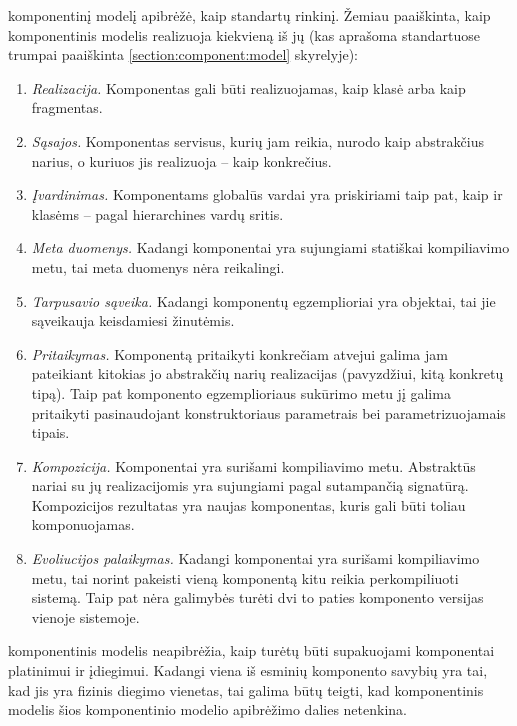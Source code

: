 \cite[37]{heineman2001component} komponentinį modelį apibrėžė, kaip
standartų rinkinį. Žemiau paaiškinta, kaip 
komponentinis modelis realizuoja kiekvieną iš jų (kas aprašoma
standartuose trumpai paaiškinta \ref{section:component:model}
skyrelyje):
\begin{enumerate}
  \item \emph{Realizacija.}
    Komponentas gali būti realizuojamas, kaip  klasė
    arba kaip fragmentas.
  \item \emph{Sąsajos.}
    Komponentas servisus, kurių jam reikia, nurodo kaip abstrakčius
    narius, o kuriuos jis realizuoja – kaip konkrečius.
  \item \emph{Įvardinimas.}
    Komponentams globalūs vardai yra priskiriami taip pat, kaip ir
     klasėms – pagal hierarchines vardų sritis.
  \item \emph{Meta duomenys.} Kadangi  komponentai yra
    sujungiami statiškai kompiliavimo metu, tai meta duomenys nėra
    reikalingi.
  \item \emph{Tarpusavio sąveika.}
    Kadangi komponentų egzemplioriai  yra
    objektai, tai jie sąveikauja keisdamiesi žinutėmis.
  \item \emph{Pritaikymas.}
    Komponentą pritaikyti konkrečiam atvejui galima jam pateikiant
    kitokias jo abstrakčių narių realizacijas (pavyzdžiui, kitą
    konkretų tipą). Taip pat komponento egzemplioriaus sukūrimo
    metu jį galima pritaikyti pasinaudojant konstruktoriaus parametrais
    bei parametrizuojamais tipais.
  \item \emph{Kompozicija.}
    Komponentai yra surišami kompiliavimo metu. Abstraktūs nariai su
    jų realizacijomis yra sujungiami pagal sutampančią signatūrą.
    Kompozicijos rezultatas yra naujas komponentas, kuris gali būti
    toliau komponuojamas.
  \item \emph{Evoliucijos palaikymas.}
    Kadangi komponentai yra surišami kompiliavimo metu, tai norint
    pakeisti vieną komponentą kitu reikia perkompiliuoti sistemą.
    Taip pat nėra galimybės turėti dvi to paties komponento versijas
    vienoje sistemoje.
\end{enumerate}

 komponentinis modelis neapibrėžia, kaip turėtų būti
supakuojami komponentai platinimui ir įdiegimui. Kadangi viena iš
esminių komponento savybių yra tai, kad jis yra fizinis
diegimo vienetas, tai galima būtų teigti, kad 
komponentinis modelis šios komponentinio modelio apibrėžimo dalies
netenkina.

